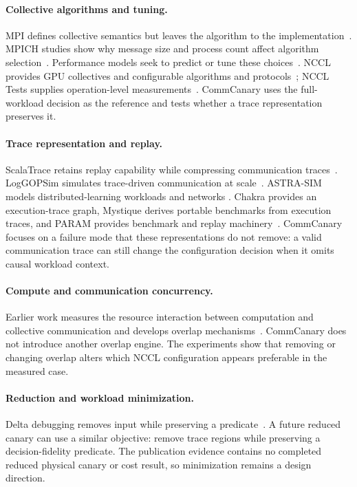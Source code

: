\documentclass[10pt,twocolumn]{article}
\begin{document}
\paragraph{Collective algorithms and tuning.} MPI defines collective semantics
but leaves the algorithm to the implementation~\cite{mpi}. MPICH studies show
why message size and process count affect algorithm selection~\cite{thakur}.
Performance models seek to predict or tune these choices~\cite{vadhiyar}. NCCL
provides GPU collectives and configurable algorithms and protocols~\cite{nccl};
NCCL Tests supplies operation-level measurements~\cite{nccltests}. CommCanary
uses the full-workload decision as the reference and tests whether a trace
representation preserves it.

\paragraph{Trace representation and replay.} ScalaTrace retains replay
capability while compressing communication traces~\cite{scalatrace}.
LogGOPSim simulates trace-driven communication at scale~\cite{loggopsim}.
ASTRA-SIM models distributed-learning workloads and networks
\cite{astrasim,astrasim2}. Chakra provides an execution-trace graph, Mystique
derives portable benchmarks from execution traces, and PARAM provides benchmark
and replay machinery~\cite{chakra,mystique,param}. CommCanary focuses on a
failure mode that these representations do not remove: a valid communication
trace can still change the configuration decision when it omits causal workload
context.

\paragraph{Compute and communication concurrency.} Earlier work measures the
resource interaction between computation and collective communication and
develops overlap mechanisms~\cite{overlap}. CommCanary does not introduce
another overlap engine. The experiments show that removing or changing overlap
alters which NCCL configuration appears preferable in the measured case.

\paragraph{Reduction and workload minimization.} Delta debugging removes input
while preserving a predicate~\cite{ddmin}. A future reduced canary can use a
similar objective: remove trace regions while preserving a decision-fidelity
predicate. The publication evidence contains no completed reduced physical
canary or cost result, so minimization remains a design direction.
\end{document}
